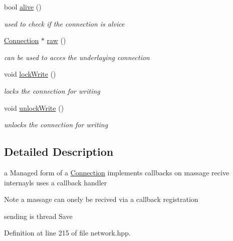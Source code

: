 \begin{DoxyCompactItemize}
bool \hyperlink{classllu_1_1network_1_1_managed_connection_a21eb51f8f91b3103a71708c4b190784a}{alive} ()
\begin{DoxyCompactList}\small\item\em used to check if the connection is alvice \end{DoxyCompactList}\item 
\hyperlink{classllu_1_1network_1_1_connection}{Connection} $\ast$ \hyperlink{classllu_1_1network_1_1_managed_connection_a6b75597f4a9ed3be7202f5118383eba5}{raw} ()
\begin{DoxyCompactList}\small\item\em can be used to acces the underlaying connection \end{DoxyCompactList}\item 
void \hyperlink{classllu_1_1network_1_1_managed_connection_a2c5a8dca6f2cae9b3ae8f928a1c940ed}{lock\+Write} ()
\begin{DoxyCompactList}\small\item\em locks the connection for writing \end{DoxyCompactList}\item 
void \hyperlink{classllu_1_1network_1_1_managed_connection_a47c8c8c501e5794f2ab0ccd9faa16c2e}{unlock\+Write} ()
\begin{DoxyCompactList}\small\item\em unlocks the connection for writing \end{DoxyCompactList}\end{DoxyCompactItemize}


\subsection{Detailed Description}
a Managed form of a \hyperlink{classllu_1_1network_1_1_connection}{Connection} implements callbacks on massage recive internayls uses a callback handler 

\begin{DoxyNote}{Note}
a massage can onely be recived via a callback registration 

sending is thread Save 
\end{DoxyNote}


Definition at line 215 of file network.\+hpp.



